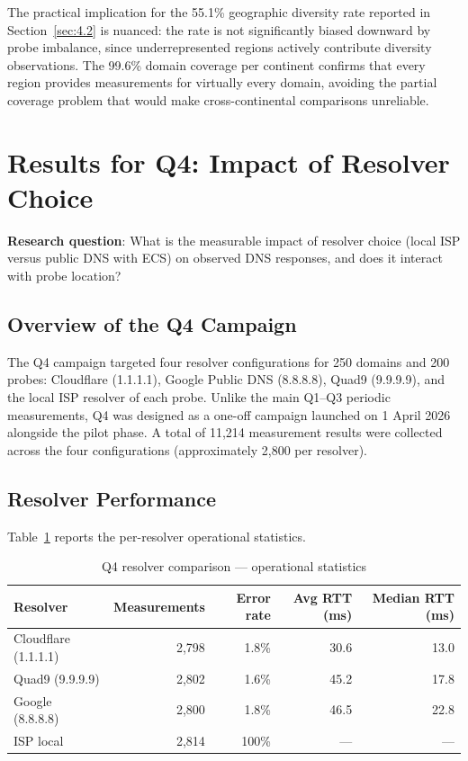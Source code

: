 The practical implication for the 55.1\% geographic diversity rate reported in Section~\ref{sec:4.2} is nuanced: the rate is not significantly biased downward by probe imbalance, since underrepresented regions actively contribute diversity observations. The 99.6\% domain coverage per continent confirms that every region provides measurements for virtually every domain, avoiding the partial coverage problem that would make cross-continental comparisons unreliable.

\bigskip
\section{Results for Q4: Impact of Resolver Choice}
\label{sec:4.5}

\textbf{Research question}: What is the measurable impact of resolver choice (local ISP versus public DNS with ECS) on observed DNS responses, and does it interact with probe location?

\subsection{Overview of the Q4 Campaign}
\label{subsec:4.5.1}

The Q4 campaign targeted four resolver configurations for 250 domains and 200 probes: Cloudflare (1.1.1.1), Google Public DNS (8.8.8.8), Quad9 (9.9.9.9), and the local ISP resolver of each probe. Unlike the main Q1--Q3 periodic measurements, Q4 was designed as a one-off campaign launched on 1 April 2026 alongside the pilot phase. A total of 11,214 measurement results were collected across the four configurations (approximately 2,800 per resolver).

\subsection{Resolver Performance}
\label{subsec:4.5.2}

Table~\ref{tab:4.4} reports the per-resolver operational statistics.

\begin{table}[H]
\centering
\small
\caption{Q4 resolver comparison --- operational statistics}
\label{tab:4.4}
\begin{tabular}{l r r r r}
\toprule
\textbf{Resolver} & \textbf{Measurements} & \textbf{Error rate} & \textbf{Avg RTT (ms)} & \textbf{Median RTT (ms)} \\
\midrule
Cloudflare (1.1.1.1) & 2,798 & 1.8\%  & 30.6  & 13.0  \\
Quad9 (9.9.9.9)      & 2,802 & 1.6\%  & 45.2  & 17.8  \\
Google (8.8.8.8)     & 2,800 & 1.8\%  & 46.5  & 22.8  \\
ISP local            & 2,814 & 100\%  & ---   & ---   \\
\bottomrule
\end{tabular}
\end{table}

